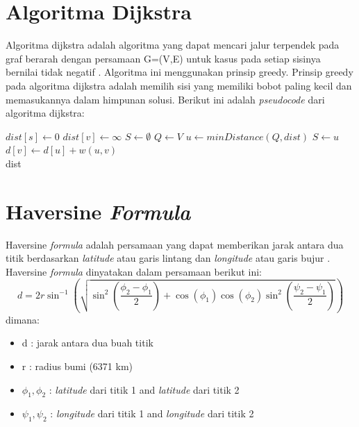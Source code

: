 \section{Algoritma Dijkstra}
Algoritma dijkstra adalah algoritma yang dapat mencari jalur terpendek pada graf
berarah dengan persamaan G=(V,E) untuk kasus pada setiap sisinya bernilai tidak
negatif \cite{Cormen:2001}. Algoritma ini menggunakan prinsip greedy. Prinsip
greedy pada algoritma dijkstra adalah memilih sisi yang memiliki bobot paling
kecil dan memasukannya dalam himpunan solusi. Berikut ini adalah
\textit{pseudocode} dari algoritma dijkstra:
\begin{algorithm}{}\label{dijkstra}
\caption{$Dijkstra$}
\begin{algorithmic}
\State $dist[s] \leftarrow 0$
\State $dist[v] \leftarrow \infty$ 
\EndFor
\State $S \leftarrow \emptyset$
\State $Q \leftarrow V$
\State $u \leftarrow  minDistance(Q,dist)$
\State $S \leftarrow u$
\State $d[v] \leftarrow d[u] + w(u,  v)$
\EndIf
\EndFor
\EndWhile \\
\Return dist
\end{algorithmic}
\end{algorithm}

\section{Haversine \textit{Formula}}
Haversine \textit{formula} adalah persamaan yang dapat memberikan jarak antara
dua titik berdasarkan \textit{latitude} atau garis lintang dan
\textit{longitude} atau garis bujur \cite{haversine}. Haversine
\textit{formula} dinyatakan dalam persamaan berikut ini:
\\
\[d=2r\sin^{-1}(\sqrt{\sin^2(\frac{\phi_2-\phi_1}{2})+\cos(\phi_1)\cos(\phi_2)\sin^2(\frac{\psi_2-\psi_1}{2})})\]
dimana:
\begin{itemize}
  \item d : jarak antara dua buah titik
  
  \item r : radius bumi (6371 km)
   
  \item $\phi_1, \phi_2$ : \textit{latitude} dari titik 1 and \textit{latitude}
  dari titik 2
  
  \item $\psi_1, \psi_2$ : \textit{longitude} dari titik 1 and
  \textit{longitude} dari titik 2
\end{itemize}

